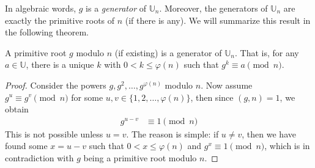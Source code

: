 \documentclass{subfile}
\begin{document}
In algebraic words, $g$ is a \textit{generator} of $\mathbb U_n$. Moreover, the generators of $\mathbb U_n$ are exactly the primitive roots of $n$ (if there is any). We will summarize this result in the following theorem.

	\begin{theorem}\label{thm:prequalsU}
		A primitive root $g$ modulo $n$ (if existing) is a generator of $\mathbb U_n$. That is, for any $a\in\mathbb{U}$, there is a unique $k$ with $0< k\leq\varphi(n)$ such that $g^k \equiv a \pmod n$.
	\end{theorem}

	\begin{proof}
		Consider the powers $g,g^2,\ldots,g^{\varphi (n)}$ modulo $n$. Now assume  $g^u  \equiv g^v \pmod n$ for some $u, v \in \{1,2,\ldots, \varphi(n)\}$, then since $(g,n)=1$, we obtain
			\begin{align*}
				g^{u-v}&\equiv1\pmod n
			\end{align*}
		This is not possible unless $u=v$. The reason is simple: if $u \neq v$, then we have found some $x=u-v$ such that $0 < x \leq \varphi(n)$ and $g^x \equiv 1 \pmod n$, which is in contradiction with $g$ being a primitive root modulo $n$.
	\end{proof}
\end{document}
